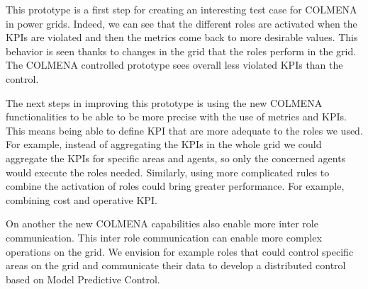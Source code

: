\documentclass{article}
\begin{document}
This prototype is a first step for creating an interesting test case for COLMENA in power grids. Indeed, we can see that the different roles are activated when the KPIs are violated and then the metrics come back to more desirable values. This behavior is seen thanks to changes in the grid that the roles perform in the grid. The COLMENA controlled prototype sees overall less violated KPIs than the control. 

The next steps in improving this prototype is using the new COLMENA functionalities to be able to be more precise with the use of metrics and KPIs. This means being able to define KPI that are more adequate to the roles we used. For example, instead of aggregating the KPIs in the whole grid we could aggregate the KPIs for specific areas and agents, so only the concerned agents would execute the roles needed. Similarly, using more complicated rules to combine the activation of roles could bring greater performance. For example, combining cost and operative KPI.

On another the new COLMENA capabilities also enable more inter role communication. This inter role communication can enable more complex operations on the grid. We envision for example roles that could control specific areas on the grid and communicate their data to develop a distributed control based on Model Predictive Control. 
\nocite{*}
\printbibliography
\end{document}
